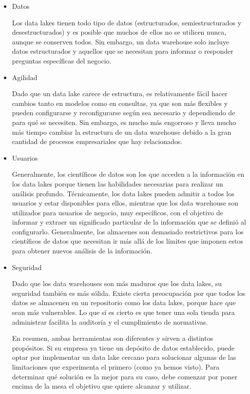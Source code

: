 \documentclass[preprint,12pt]{elsarticle}
\begin{document}
\begin{itemize}

\item Datos

Los data lakes tienen todo tipo de datos (estructurados, semiestructurados y desestructurados) y es posible que muchos de ellos no se utilicen nunca, aunque se conserven todos. Sin embargo, un data warehouse solo incluye datos estructurados y aquellos que se necesitan para informar o responder preguntas específicas del negocio.


\item Agilidad

Dado que un data lake carece de estructura, es relativamente fácil hacer cambios tanto en modelos como en consultas, ya que son más flexibles y pueden configurarse y reconfigurarse según sea necesario y dependiendo de para qué se necesiten. Sin embargo, es mucho más engorroso y lleva mucho más tiempo cambiar la estructura de un data warehouse debido a la gran cantidad de procesos empresariales que hay relacionados.


\item Usuarios

Generalmente, los científicos de datos son los que acceden a la información en los data lakes porque tienen las habilidades necesarias para realizar un análisis profundo. Técnicamente, los data lakes pueden admitir a todos los usuarios y estar disponibles para ellos, mientras que los data warehouse son utilizados para usuarios de negocio, muy específicos, con el objetivo de informar y extraer un significado particular de la información que se definió al configurarlo. Generalmente, los almacenes son demasiado restrictivos para los científicos de datos que necesitan ir más allá de los límites que imponen estos para obtener nuevos análisis de la información.


\item Seguridad

Dado que los data warehouses son más maduros que los data lakes, su seguridad también es más sólida. Existe cierta preocupación por que todos los datos se almacenen en un repositorio como los data lakes, porque hace que sean más vulnerables. Lo que sí es cierto es que tener una sola tienda para administrar facilita la auditoría y el cumplimiento de normativas.

En resumen, ambas herramientas son diferentes y sirven a distintos propósitos. Si su empresa ya tiene un depósito de datos establecido, puede optar por implementar un data lake cercano para solucionar algunas de las limitaciones que experimenta el primero (como ya hemos visto). Para determinar qué solución es la mejor para su caso, debe comenzar por poner encima de la mesa el objetivo que quiere alcanzar y utilizar.
\end{itemize}
\end{document}
